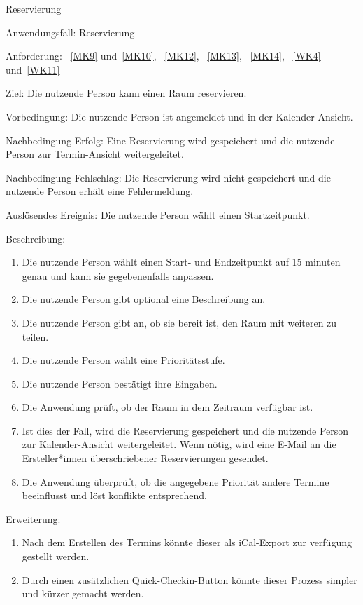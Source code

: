\begin{function}{40}{Reservierung}
    \item[Anwendungsfall:] Reservierung
    \item[Anforderung:]~\ref{MK9} und~\ref{MK10}, ~\ref{MK12}, ~\ref{MK13}, ~\ref{MK14}, ~\ref{WK4} und~\ref{WK11}
    \item[Ziel:] Die nutzende Person kann einen Raum reservieren.
    \item[Vorbedingung:] Die nutzende Person ist angemeldet und in der Kalender-Ansicht.
    \item[Nachbedingung Erfolg:] Eine Reservierung wird gespeichert und die nutzende Person zur Termin-Ansicht weitergeleitet.
    \item[Nachbedingung Fehlschlag:] Die Reservierung wird nicht gespeichert und die nutzende Person erhält eine Fehlermeldung.
    \item[Auslösendes Ereignis:] Die nutzende Person wählt einen Startzeitpunkt.
    \item[Beschreibung:] ~
    \begin{enumerate}
        \item Die nutzende Person wählt einen Start- und Endzeitpunkt auf 15 minuten genau und kann sie gegebenenfalls anpassen.
        \item Die nutzende Person gibt optional eine Beschreibung an.
        \item Die nutzende Person gibt an, ob sie bereit ist, den Raum mit weiteren zu teilen.
        \item Die nutzende Person wählt eine Prioritätsstufe.
        \item Die nutzende Person bestätigt ihre Eingaben.
        \item Die Anwendung prüft, ob der Raum in dem Zeitraum verfügbar ist.
        \item Ist dies der Fall, wird die Reservierung gespeichert und die nutzende Person zur Kalender-Ansicht weitergeleitet.
        Wenn nötig, wird eine E-Mail an die Ersteller*innen überschriebener Reservierungen gesendet.
        \item Die Anwendung überprüft, ob die angegebene Priorität andere Termine beeinflusst und löst konflikte entsprechend.
    \end{enumerate}
    \item[Erweiterung:]
    \begin{enumerate}
        \item Nach dem Erstellen des Termins könnte dieser als iCal-Export zur verfügung gestellt werden.
        \item Durch einen zusätzlichen Quick-Checkin-Button könnte dieser Prozess simpler und kürzer gemacht werden.
    \end{enumerate}
\end{function}

